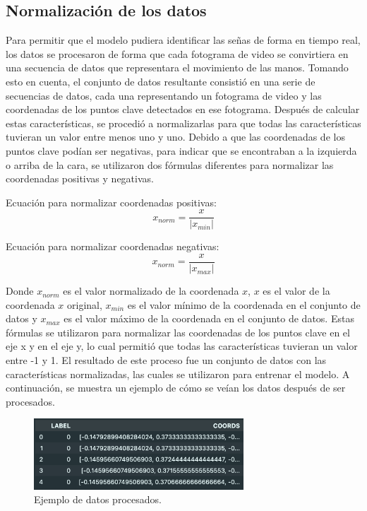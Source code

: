 \subsection{Normalización de los datos}

Para permitir que el modelo pudiera identificar las señas de forma en tiempo real, los datos se procesaron de forma que cada fotograma de video se convirtiera en una secuencia de datos que representara el movimiento de las manos.
Tomando esto en cuenta, el conjunto de datos resultante consistió en una serie de secuencias de datos, cada una representando un fotograma de video y las coordenadas de los puntos clave detectados en ese fotograma.
Después de calcular estas características, se procedió a normalizarlas para que todas las características tuvieran un valor entre menos uno y uno.
Debido a que las coordenadas de los puntos clave podían ser negativas, para indicar que se encontraban a la izquierda o arriba de la cara, se utilizaron dos fórmulas diferentes para normalizar las coordenadas positivas y negativas.

Ecuación para normalizar coordenadas positivas:
\begin{equation}
    x_{norm} = \frac{x}{\left| x_{min} \right|}
\end{equation}

Ecuación para normalizar coordenadas negativas:
\begin{equation}
    x_{norm} = \frac{x}{\left| x_{max} \right|}
\end{equation}

Donde $x_{norm}$ es el valor normalizado de la coordenada $x$, $x$ es el valor de la coordenada $x$ original, $x_{min}$ es el valor mínimo de la coordenada en el conjunto de datos y $x_{max}$ es el valor máximo de la coordenada en el conjunto de datos.
Estas fórmulas se utilizaron para normalizar las coordenadas de los puntos clave en el eje x y en el eje y, lo cual permitió que todas las características tuvieran un valor entre -1 y 1.
El resultado de este proceso fue un conjunto de datos con las características normalizadas, las cuales se utilizaron para entrenar el modelo.
A continuación, se muestra un ejemplo de cómo se veían los datos después de ser procesados.

\begin{figure}[H]
    \centering
    \includegraphics[width=0.7\textwidth]{figuras/ProccessedData.png}
    \caption{Ejemplo de datos procesados.}
    \label{fig:processed_data}    
\end{figure}

